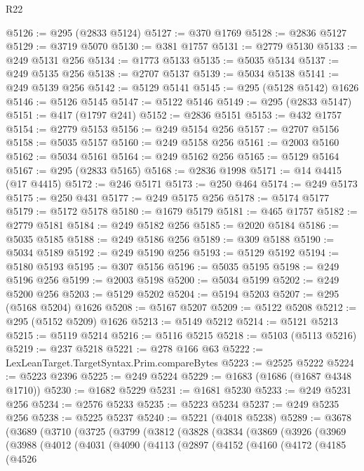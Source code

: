 \begin{lexlean}{R22}
\begin{coremodule}
@5126 := @295 (@2833 @5124)
@5127 := @370 @1769
@5128 := @2836 @5127
@5129 := @3719 @5070
@5130 := @381 @1757
@5131 := @2779 @5130
@5133 := @249 @5131 @256
@5134 := @1773 @5133
@5135 := @5035 @5134
@5137 := @249 @5135 @256
@5138 := @2707 @5137
@5139 := @5034 @5138
@5141 := @249 @5139 @256
@5142 := @5129 @5141
@5145 := @295 (@5128 @5142) @1626
@5146 := @5126 @5145
@5147 := @5122 @5146
@5149 := @295 (@2833 @5147)
@5151 := @417 (@1797 @241)
@5152 := @2836 @5151
@5153 := @432 @1757
@5154 := @2779 @5153
@5156 := @249 @5154 @256
@5157 := @2707 @5156
@5158 := @5035 @5157
@5160 := @249 @5158 @256
@5161 := @2003 @5160
@5162 := @5034 @5161
@5164 := @249 @5162 @256
@5165 := @5129 @5164
@5167 := @295 (@2833 @5165)
@5168 := @2836 @1998
@5171 := @14 @4415 (@17 @4415)
@5172 := @246 @5171
@5173 := @250 @464
@5174 := @249 @5173
@5175 := @250 @431
@5177 := @249 @5175 @256
@5178 := @5174 @5177
@5179 := @5172 @5178
@5180 := @1679 @5179
@5181 := @465 @1757
@5182 := @2779 @5181
@5184 := @249 @5182 @256
@5185 := @2020 @5184
@5186 := @5035 @5185
@5188 := @249 @5186 @256
@5189 := @309 @5188
@5190 := @5034 @5189
@5192 := @249 @5190 @256
@5193 := @5129 @5192
@5194 := @5180 @5193
@5195 := @307 @5156
@5196 := @5035 @5195
@5198 := @249 @5196 @256
@5199 := @2003 @5198
@5200 := @5034 @5199
@5202 := @249 @5200 @256
@5203 := @5129 @5202
@5204 := @5194 @5203
@5207 := @295 (@5168 @5204) @1626
@5208 := @5167 @5207
@5209 := @5122 @5208
@5212 := @295 (@5152 @5209) @1626
@5213 := @5149 @5212
@5214 := @5121 @5213
@5215 := @5119 @5214
@5216 := @5116 @5215
@5218 := @5103 (@5113 @5216)
@5219 := @237 @5218
@5221 := @278 @166 @63
@5222 := LexLeanTarget.TargetSyntax.Prim.compareBytes
@5223 := @2525 @5222
@5224 := @5223 @2396
@5225 := @249 @5224
@5229 := @1683 (@1686 (@1687 @4348 @1710))
@5230 := @1682 @5229
@5231 := @1681 @5230
@5233 := @249 @5231 @256
@5234 := @2576 @5233
@5235 := @5223 @5234
@5237 := @249 @5235 @256
@5238 := @5225 @5237
@5240 := @5221 (@4018 @5238)
@5289 := @3678
    (@3689
      (@3710
        (@3725
          (@3799
            (@3812
              (@3828
                (@3834
                  (@3869
                    (@3926
                      (@3969
                        (@3988
                          (@4012
                            (@4031
                              (@4090
                                (@4113
                                  (@2897
                                    (@4152
                                      (@4160
                                        (@4172
                                          (@4185
                                            (@4526

\end{coremodule}
\end{lexlean}
